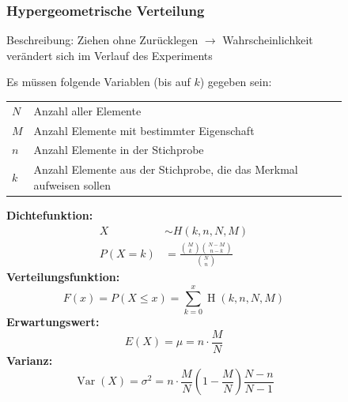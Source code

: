 \documentclass[12pt, a4paper]{scrreprt}
\begin{document}
\begin{figure}[H]
  \subsubsection{Hypergeometrische Verteilung}
Beschreibung: Ziehen ohne Zurücklegen $\rightarrow$ Wahrscheinlichkeit verändert sich im Verlauf des Experiments

  Es müssen folgende Variablen (bis auf \(k\)) gegeben sein:

  \begin{tabular}{ll}
    \toprule
    \(N\) & Anzahl aller Elemente\\
    \(M\) & Anzahl Elemente mit bestimmter Eigenschaft\\
    \(n\) & Anzahl Elemente in der Stichprobe\\
    \(k\) & Anzahl Elemente aus der Stichprobe, die das Merkmal aufweisen sollen\\
    \bottomrule
  \end{tabular}

  \textbf{Dichtefunktion:}
  \begin{align*}
    X &\sim H(k, n, N, M)\\[1em]
    P(X = k) &= \frac{\binom{M}{k}\binom{N-M}{n-k}}{\binom{N}{n}}
  \end{align*}
  \textbf{Verteilungsfunktion:}
  \[F(x) = P(X \leq x) = \sum_{k=0}^x\operatorname{H}(k,n,N,M)\]
  \textbf{Erwartungswert:}
  \[E(X) = \mu = n \cdot \frac{M}{N}\]
  \textbf{Varianz:}
  \[\operatorname{Var}(X) = \sigma^2 = n \cdot \frac{M}{N} \left(1 - \frac{M}{N}\right) \frac{N - n}{N - 1}\]
\end{figure}
\end{document}
